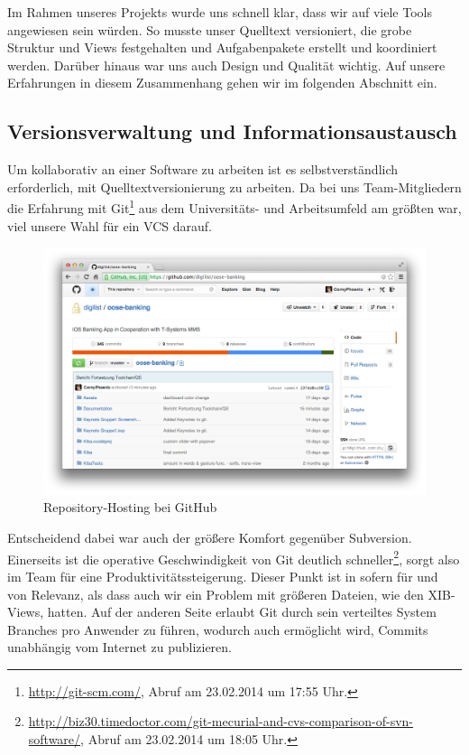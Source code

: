 Im Rahmen unseres Projekts wurde uns schnell klar, dass wir auf viele Tools angewiesen sein würden. So musste unser Quelltext versioniert, die grobe Struktur und Views festgehalten und Aufgabenpakete erstellt und koordiniert werden. Darüber hinaus war uns auch Design und Qualität wichtig. Auf unsere Erfahrungen in diesem Zusammenhang gehen wir im folgenden Abschnitt ein.

\subsection{Versionsverwaltung und Informationsaustausch}
	Um kollaborativ an einer Software zu arbeiten ist es selbstverständlich erforderlich, mit Quelltextversionierung zu arbeiten. Da bei uns Team-Mitgliedern die Erfahrung mit Git\footnote{\url{http://git-scm.com/}, Abruf am 23.02.2014 um 17:55 Uhr.} aus dem Universitäts- und Arbeitsumfeld am größten war, viel unsere Wahl für ein \acs{VCS} darauf.
	
\begin{figure}[h!]
	\centering
	\includegraphics[scale=.25]{Pictures/GitHubOverview}
	\caption{Repository-Hosting bei GitHub \label{fig:GitHubOverview}}
\end{figure}
	
	Entscheidend dabei war auch der größere Komfort gegenüber Subversion. Einerseits ist die operative Geschwindigkeit von Git deutlich schneller\footnote{\url{http://biz30.timedoctor.com/git-mecurial-and-cvs-comparison-of-svn-software/}, Abruf am 23.02.2014 um 18:05 Uhr.}, sorgt also im Team für eine Produktivitätssteigerung. Dieser Punkt ist in sofern für und von Relevanz, als dass auch wir ein Problem mit größeren Dateien, wie den XIB-Views, hatten. Auf der anderen Seite erlaubt Git durch sein verteiltes System Branches pro Anwender zu führen, wodurch auch ermöglicht wird, Commits  unabhängig vom Internet zu publizieren. 
	
